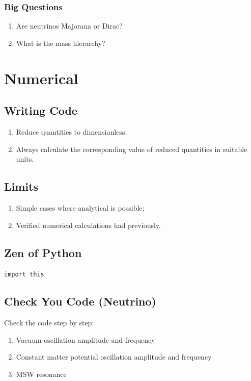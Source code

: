 \documentclass{sciposter}
\begin{document}
\begin{multicols}{3}
\subsubsection{Big Questions}

\begin{enumerate}
    \item Are neutrinos Majorana or Dirac?
    \item What is the mass hierarchy?
\end{enumerate}



\section{Numerical}

\subsection{Writing Code}


\begin{enumerate}
\item Reduce quantities to dimensionless;
\item Always calculate the corresponding value of reduced quantities in suitable units.
\end{enumerate}

\subsection{Limits}

\begin{enumerate}
\item Simple cases where analytical is possible;
\item Verified numerical calculations had previously.
\end{enumerate}



\subsection{Zen of Python}

\verb+import this+


\subsection{Check You Code (Neutrino)}
Check the code step by step:

\begin{enumerate}
\item Vacuum oscillation amplitude and frequency
\item Constant matter potential oscillation amplitude and frequency
\item MSW resonance
\end{enumerate}






\end{multicols}
\end{document}
